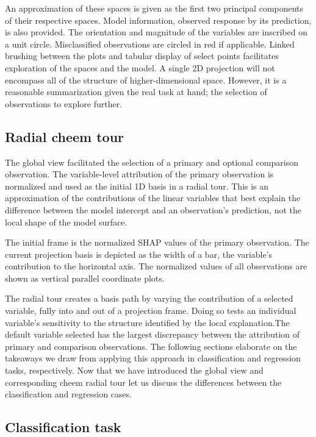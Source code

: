 \documentclass[
  article]{article}
\begin{document}
An approximation of these spaces is given as the first two principal components of their respective spaces. Model information, observed response by its prediction, is also provided. The orientation and magnitude of the variables are inscribed on a unit circle. Misclassified observations are circled in red if applicable. Linked brushing between the plots and tabular display of select points facilitates exploration of the spaces and the model. A single 2D projection will not encompass all of the structure of higher-dimensional space. However, it is a reasonable summarization given the real task at hand; the selection of observations to explore further.

\hypertarget{radial-cheem-tour}{%
\subsection{Radial cheem tour}\label{radial-cheem-tour}}

The global view facilitated the selection of a primary and optional comparison observation. The variable-level attribution of the primary observation is normalized and used as the initial 1D basis in a radial tour. This is an approximation of the contributions of the linear variables that best explain the difference between the model intercept and an observation's prediction, not the local shape of the model surface.

The initial frame is the normalized SHAP values of the primary observation. The current projection basis is depicted as the width of a bar, the variable's contribution to the horizontal axis. The normalized values of all observations are shown as vertical parallel coordinate plots.

The radial tour creates a basis path by varying the contribution of a selected variable, fully into and out of a projection frame. Doing so tests an individual variable's sensitivity to the structure identified by the local explanation.The default variable selected has the largest discrepancy between the attribution of primary and comparison observations. The following sections elaborate on the takeaways we draw from applying this approach in classification and regression tasks, respectively. Now that we have introduced the global view and corresponding cheem radial tour let us discuss the differences between the classification and regression cases.

\hypertarget{classification-task}{%
\subsection{Classification task}\label{classification-task}}
\end{document}
